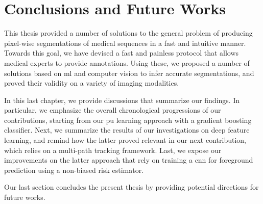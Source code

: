 \chapter{Conclusions and Future Works}
\glsresetall

This thesis provided a number of solutions to the general problem of producing pixel-wise segmentations of
medical sequences in a fast and intuitive manner.
Towards this goal, we have devised a fast and painless protocol that allows medical experts to provide annotations.
Using these, we proposed a number of solutions based on \gls{ml} and computer vision to infer accurate segmentations,
and proved their validity on a variety of imaging modalities.

In this last chapter, we provide discussions that summarize our findings.
In particular, we emphasize the overall chronological progressions of our contributions, starting from our \gls{pu} learning approach with a gradient boosting classifier.
Next, we summarize the results of our investigations on deep feature learning, and remind how the latter proved relevant in our next contribution, which relies on a multi-path tracking framework.
Last, we expose our improvements on the latter approach that rely on training a \gls{cnn} for foreground prediction using a non-biased risk estimator.

Our last section concludes the present thesis by providing potential directions for future works.





